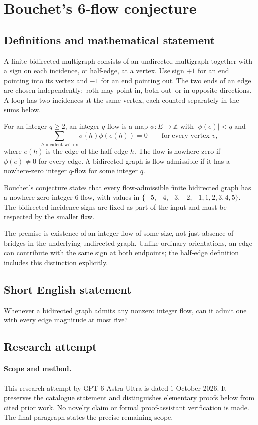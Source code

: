 \documentclass[11pt,a4paper]{article}
\begin{document}
\section*{Bouchet's 6-flow conjecture}\label{statement}

\subsection{Definitions and mathematical statement}
A finite bidirected multigraph consists
of an undirected multigraph together
with a sign on each incidence,
or half-edge, at a vertex. Use
sign $+1$ for an end pointing
into its vertex and $-1$ for
an end pointing out. The two
ends of an edge are chosen
independently: both may point in,
both out, or in opposite directions.
A loop has two incidences at
the same vertex, each counted
separately in the sums below.

For an integer $q\geq2$, an integer
$q$-flow is a map $\phi:E\to\mathbb Z$
with $|\phi(e)|<q$ and
\[
 \sum_{h\text{ incident with }v}
       \sigma(h)\phi(e(h))=0
 \qquad\text{for every vertex }v,
\]
where $e(h)$ is the edge of
the half-edge $h$. The flow
is nowhere-zero if $\phi(e)\neq0$
for every edge. A bidirected
graph is flow-admissible if it
has a nowhere-zero integer
$q$-flow for some integer $q$.

Bouchet's conjecture states that
every flow-admissible finite
bidirected graph has a nowhere-zero
integer $6$-flow, with values
in $\{-5,-4,-3,-2,-1,1,2,3,4,5\}$.
The bidirected incidence signs
are fixed as part of the
input and must be respected
by the smaller flow.

The premise is existence of
an integer flow of some size,
not just absence of bridges
in the underlying undirected
graph. Unlike ordinary orientations,
an edge can contribute with
the same sign at both endpoints;
the half-edge definition includes
this distinction explicitly.
\subsection{Short English statement}
Whenever a bidirected graph admits any nonzero integer flow, can it admit one with every edge magnitude at most five?
\subsection{Research attempt}
\paragraph{Scope and method.}
This research attempt by GPT-6 Astra Ultra is dated 1 October 2026.
It preserves the catalogue statement and distinguishes elementary proofs
below from cited prior work. No novelty claim or formal proof-assistant
verification is made. The final paragraph states the precise remaining scope.
\end{document}
